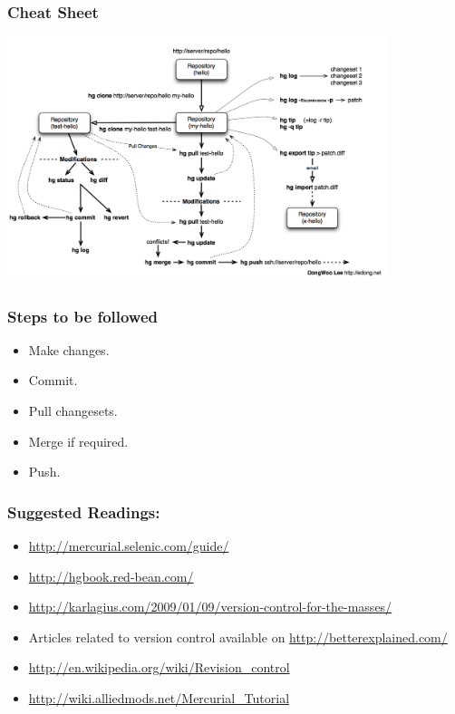 \documentclass[14pt,compress]{beamer}
\newcounter{time}
\newcommand{\inctime}[1]{\addtocounter{time}{#1}{\tiny \thetime\ m}}
\begin{document}
\begin{frame}
  \frametitle{Cheat Sheet}
  \begin{center}
  \includegraphics[height=2.8in, interpolate=true]{dongwoo-Hg-120dpi}  
  \end{center}  
\end{frame}

\begin{frame}
  \frametitle{Steps to be followed}
  \begin{itemize}
  \item Make changes.
  \item Commit.
  \item Pull changesets.
  \item Merge if required.
  \item Push.
  \end{itemize}
  \inctime{10}
\end{frame}

\begin{frame}
  \frametitle{Suggested Readings:}
  \begin{itemize}
  \item \url{http://mercurial.selenic.com/guide/}
  \item \url{http://hgbook.red-bean.com/}    
  \item \url{http://karlagius.com/2009/01/09/version-control-for-the-masses/}
  \item Articles related to version control available on \url{http://betterexplained.com/}
  \item \url{http://en.wikipedia.org/wiki/Revision_control}
  \item \url{http://wiki.alliedmods.net/Mercurial_Tutorial}
  \end{itemize}
\end{frame}
\end{document}
